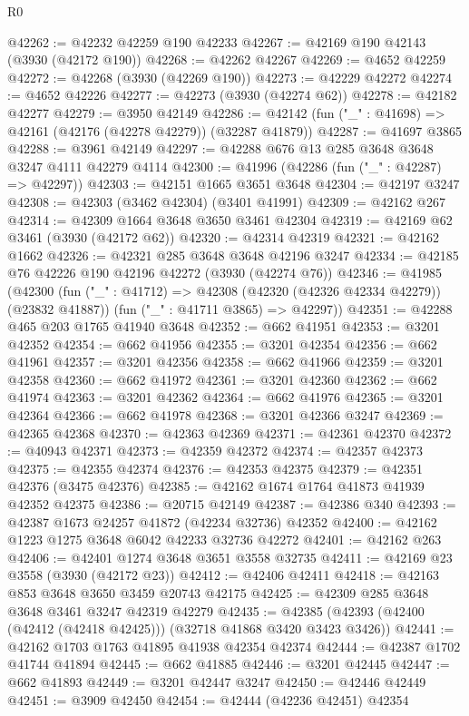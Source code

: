 \begin{lexlean}{R0}
\begin{coremodule}
@42262 := @42232 @42259 @190 @42233
@42267 := @42169 @190 @42143 (@3930 (@42172 @190))
@42268 := @42262 @42267
@42269 := @4652 @42259
@42272 := @42268 (@3930 (@42269 @190))
@42273 := @42229 @42272
@42274 := @4652 @42226
@42277 := @42273 (@3930 (@42274 @62))
@42278 := @42182 @42277
@42279 := @3950 @42149
@42286 := @42142 (fun ("_" : @41698) => @42161 (@42176 (@42278 @42279)) (@32287 @41879))
@42287 := @41697 @3865
@42288 := @3961 @42149
@42297 := @42288 @676 @13 @285 @3648 @3648 @3247 @4111 @42279 @4114
@42300 := @41996 (@42286 (fun ("_" : @42287) => @42297))
@42303 := @42151 @1665 @3651 @3648
@42304 := @42197 @3247
@42308 := @42303 (@3462 @42304) (@3401 @41991)
@42309 := @42162 @267
@42314 := @42309 @1664 @3648 @3650 @3461 @42304
@42319 := @42169 @62 @3461 (@3930 (@42172 @62))
@42320 := @42314 @42319
@42321 := @42162 @1662
@42326 := @42321 @285 @3648 @3648 @42196 @3247
@42334 := @42185 @76 @42226 @190 @42196 @42272 (@3930 (@42274 @76))
@42346 := @41985
    (@42300
      (fun ("_" : @41712) => @42308 (@42320 (@42326 @42334 @42279)) (@23832 @41887))
      (fun ("_" : @41711 @3865) => @42297))
@42351 := @42288 @465 @203 @1765 @41940 @3648
@42352 := @662 @41951
@42353 := @3201 @42352
@42354 := @662 @41956
@42355 := @3201 @42354
@42356 := @662 @41961
@42357 := @3201 @42356
@42358 := @662 @41966
@42359 := @3201 @42358
@42360 := @662 @41972
@42361 := @3201 @42360
@42362 := @662 @41974
@42363 := @3201 @42362
@42364 := @662 @41976
@42365 := @3201 @42364
@42366 := @662 @41978
@42368 := @3201 @42366 @3247
@42369 := @42365 @42368
@42370 := @42363 @42369
@42371 := @42361 @42370
@42372 := @40943 @42371
@42373 := @42359 @42372
@42374 := @42357 @42373
@42375 := @42355 @42374
@42376 := @42353 @42375
@42379 := @42351 @42376 (@3475 @42376)
@42385 := @42162 @1674 @1764 @41873 @41939 @42352 @42375
@42386 := @20715 @42149
@42387 := @42386 @340
@42393 := @42387 @1673 @24257 @41872 (@42234 @32736) @42352
@42400 := @42162 @1223 @1275 @3648 @6042 @42233 @32736 @42272
@42401 := @42162 @263
@42406 := @42401 @1274 @3648 @3651 @3558 @32735
@42411 := @42169 @23 @3558 (@3930 (@42172 @23))
@42412 := @42406 @42411
@42418 := @42163 @853 @3648 @3650 @3459 @20743 @42175
@42425 := @42309 @285 @3648 @3648 @3461 @3247 @42319 @42279
@42435 := @42385 (@42393 (@42400 (@42412 (@42418 @42425))) (@32718 @41868 @3420 @3423 @3426))
@42441 := @42162 @1703 @1763 @41895 @41938 @42354 @42374
@42444 := @42387 @1702 @41744 @41894
@42445 := @662 @41885
@42446 := @3201 @42445
@42447 := @662 @41893
@42449 := @3201 @42447 @3247
@42450 := @42446 @42449
@42451 := @3909 @42450
@42454 := @42444 (@42236 @42451) @42354

\end{coremodule}
\end{lexlean}
